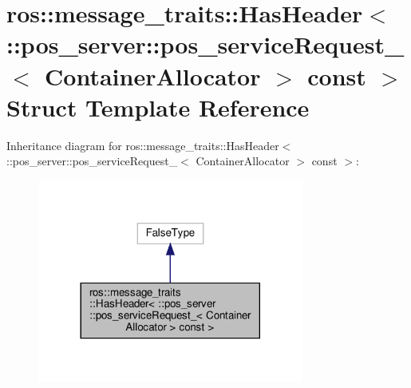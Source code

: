 \hypertarget{structros_1_1message__traits_1_1HasHeader_3_01_1_1pos__server_1_1pos__serviceRequest___3_01ContainerAllocator_01_4_01const_01_4}{}\section{ros\+:\+:message\+\_\+traits\+:\+:Has\+Header$<$ \+:\+:pos\+\_\+server\+:\+:pos\+\_\+service\+Request\+\_\+$<$ Container\+Allocator $>$ const $>$ Struct Template Reference}
\label{structros_1_1message__traits_1_1HasHeader_3_01_1_1pos__server_1_1pos__serviceRequest___3_01ContainerAllocator_01_4_01const_01_4}


Inheritance diagram for ros\+:\+:message\+\_\+traits\+:\+:Has\+Header$<$ \+:\+:pos\+\_\+server\+:\+:pos\+\_\+service\+Request\+\_\+$<$ Container\+Allocator $>$ const $>$\+:
\nopagebreak
\begin{figure}[H]
\begin{center}
\leavevmode
\includegraphics[width=248pt]{structros_1_1message__traits_1_1HasHeader_3_01_1_1pos__server_1_1pos__serviceRequest___3_01Contae5949f5584faaf89440c7f989e2f334e}
\end{center}
\end{figure}


